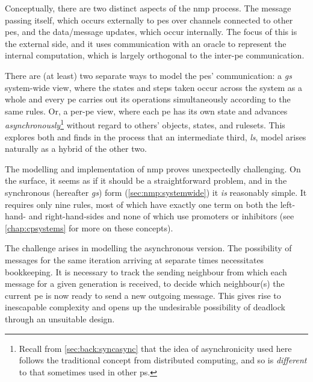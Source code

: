 Conceptually, there are two distinct aspects of the \gls{nmp} process.  The message passing itself, which occurs externally to \glspl{pe} over channels connected to other \glspl{pe}, and the data/message updates, which occur internally.  The focus of this  is the external side, and it uses communication with an oracle to represent the internal computation, which is largely orthogonal to the inter-\gls{pe} communication.

There are (at least) two separate ways to model the \glspl{pe}' communication:  a \emph{\gls{gs}} system-wide view, where the states and steps taken occur across the system as a whole and every \gls{pe} carries out its operations simultaneously according to the same rules.  Or, a per-\gls{pe} view, where each \gls{pe} has its own state and advances \emph{asynchronously}\footnote{Recall from \vref{sec:back:syncasync} that the idea of asynchronicity used here follows the traditional concept from distributed computing, and so is \emph{different} to that sometimes used in other \gls{ps}.} without regard to others' objects, states, and rulesets.  This  explores both and finds in the process that an intermediate third, \emph{\gls{ls}}, model arises naturally as a hybrid of the other two.

The modelling and implementation of \gls{nmp} proves unexpectedly challenging.  On the surface, it seems as if it should be a straightforward problem, and in the synchronous (hereafter \emph{\gls{gs}}) form (\cref{sec:nmp:systemwide}) it \emph{is} reasonably simple.  It requires only nine rules, most of which have exactly one term on both the left-hand- and right-hand-sides and none of which use \glspl{promoter} or \glspl{inhibitor} (see \cref{chap:cpsystems} for more on these concepts).


The challenge arises in modelling the asynchronous version.  The possibility of messages for the same iteration arriving at separate times necessitates bookkeeping.  It is necessary to track the sending neighbour from which each message for a given generation is received, to decide which neighbour(s) the current \gls{pe} is now ready to send a new outgoing message.  This gives rise to inescapable complexity and opens up the undesirable possibility of deadlock through an unsuitable design.

